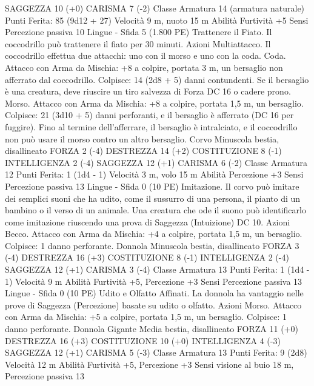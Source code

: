 \begin{multicols}{2}
SAGGEZZA 10 (+0)
CARISMA 7 (-2)
Classe Armatura 14 (armatura naturale)
\hspace*{0pt}\hfill{Punti Ferita}: 85 (9d12 + 27)
Velocità 9 m, nuoto 15 m
Abilità Furtività +5
Sensi Percezione passiva 10
Lingue -
Sfida 5 (1.800 PE)
Trattenere il Fiato. Il coccodrillo può trattenere il fiato per 30
minuti.
Azioni
Multiattacco. Il coccodrillo effettua due attacchi: uno con il
morso e uno con la coda.
Coda. Attacco con Arma da Mischia: +8 a colpire, portata 3 m,
un bersaglio non afferrato dal coccodrillo.
Colpisce: 14 (2d8 + 5) danni contundenti. Se il bersaglio è una
creatura, deve riuscire un tiro salvezza di Forza DC 16 o cadere
prono.
Morso. Attacco con Arma da Mischia: +8 a colpire, portata 1,5
m, un bersaglio.
Colpisce: 21 (3d10 + 5) danni perforanti, e il bersaglio è
afferrato (DC 16 per fuggire). Fino al termine dell’afferrare, il
bersaglio è intralciato, e il coccodrillo non può usare il morso
contro un altro bersaglio.
Corvo
Minuscola bestia, disallineato
FORZA 2 (-4)
DESTREZZA 14 (+2)
COSTITUZIONE 8 (-1)
INTELLIGENZA 2 (-4)
SAGGEZZA 12 (+1)
CARISMA 6 (-2)
Classe Armatura 12
\hspace*{0pt}\hfill{Punti Ferita}: 1 (1d4 - 1)
Velocità 3 m, volo 15 m
Abilità Percezione +3
Sensi Percezione passiva 13
Lingue -
Sfida 0 (10 PE)
Imitazione. Il corvo può imitare dei semplici suoni che ha udito,
come il sussurro di una persona, il pianto di un bambino o il
verso di un animale. Una creatura che ode il suono può
identificarlo come imitazione riuscendo una prova di Saggezza
(Intuizione) DC 10.
Azioni
Becco. Attacco con Arma da Mischia: +4 a colpire, portata 1,5
m, un bersaglio.
Colpisce: 1 danno perforante.
Donnola
Minuscola bestia, disallineato
FORZA 3 (-4)
DESTREZZA 16 (+3)
COSTITUZIONE 8 (-1)
INTELLIGENZA 2 (-4)
SAGGEZZA 12 (+1)
CARISMA 3 (-4)
Classe Armatura 13
\hspace*{0pt}\hfill{Punti Ferita}: 1 (1d4 - 1)
Velocità 9 m
Abilità Furtività +5, Percezione +3
Sensi Percezione passiva 13
Lingue -
Sfida 0 (10 PE)
Udito e Olfatto Affinati. La donnola ha vantaggio nelle prove di
Saggezza (Percezione) basate su udito o olfatto.
Azioni
Morso. Attacco con Arma da Mischia: +5 a colpire, portata 1,5
m, un bersaglio.
Colpisce: 1 danno perforante.
Donnola Gigante
Media bestia, disallineato
FORZA 11 (+0)
DESTREZZA 16 (+3)
COSTITUZIONE 10 (+0)
INTELLIGENZA 4 (-3)
SAGGEZZA 12 (+1)
CARISMA 5 (-3)
Classe Armatura 13
\hspace*{0pt}\hfill{Punti Ferita}: 9 (2d8)
Velocità 12 m
Abilità Furtività +5, Percezione +3
Sensi visione al buio 18 m, Percezione passiva 13

\end{multicols}
